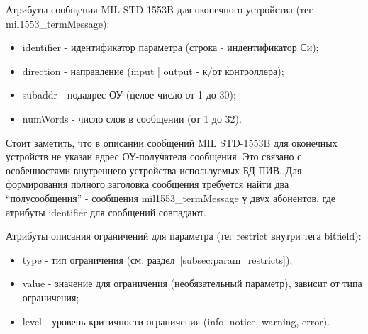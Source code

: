 Атрибуты сообщения MIL STD-1553B для оконечного устройства (тег 
mil1553\_termMessage):

\begin{itemize}
 \item identifier - идентификатор параметра (строка - индентификатор Си);
 \item direction - направление (input | output - к/от контроллера);
 \item subaddr - подадрес ОУ (целое число от 1 до 30);
 \item numWords - число слов в сообщении (от 1 до 32).
\end{itemize}

Стоит заметить, что в описании сообщений MIL STD-1553B для оконечных устройств 
не указан адрес ОУ-получателя сообщения. Это связано с особенностями 
внутреннего устройства используемых БД ПИВ. Для формирования полного заголовка 
сообщения требуется найти два ``полусообщения'' - сообщения 
mil1553\_termMessage у двух абонентов, где атрибуты identifier для сообщений 
совпадают.

Атрибуты описания ограничений для параметра (тег restrict внутри тега bitfield):

\begin{itemize}
 \item type - тип ограничения (см. раздел~\ref{subsec:param_restricts});
 \item value - значение для ограничения (необязательный параметр), зависит от 
типа ограничения;
 \item level - уровень критичности ограничения (info, notice, warning, error).
\end{itemize}

